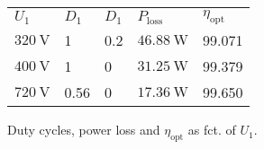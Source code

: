 
\begin{solutiontable}[ht]
    \centering  %
    \begin{tabular}{lllll}
        \toprule
        
        $U_\mathrm{1}$ & $D_1$   & $D_1$ & $P_\mathrm{loss}$      & $\eta_\mathrm{opt}$ \\ 
        $\SI{320}{\volt}$ & 1    & 0.2   & $\SI{46.88}{\watt}$ & 99.071 \\ 
        $\SI{400}{\volt}$ & 1    & 0     & $\SI{31.25}{\watt}$ & 99.379 \\ 
        $\SI{720}{\volt}$ & 0.56 & 0     & $\SI{17.36}{\watt}$ & 99.650 \\ 
        \bottomrule
    \end{tabular}
    \caption{Duty cycles, power loss and $\eta_\mathrm{opt}$ as fct. of $U_\mathrm{1}$.}
    \label{table:PowerlossDutyCycleEfficiencyOpt}  
\end{solutiontable}